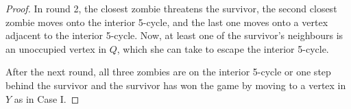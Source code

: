 \begin{proof}
In round 2, the closest zombie threatens the survivor, the second closest zombie moves onto the interior 5-cycle, and the last one moves onto a vertex adjacent to the
interior 5-cycle. Now, at least one of the survivor's neighbours is an unoccupied vertex in $Q$, which she can take to escape the interior 5-cycle.

After the next round, all three zombies are on the interior 5-cycle or one step behind the survivor and the survivor has won the game by moving to a vertex in $Y$
as in Case I.



\end{proof}
